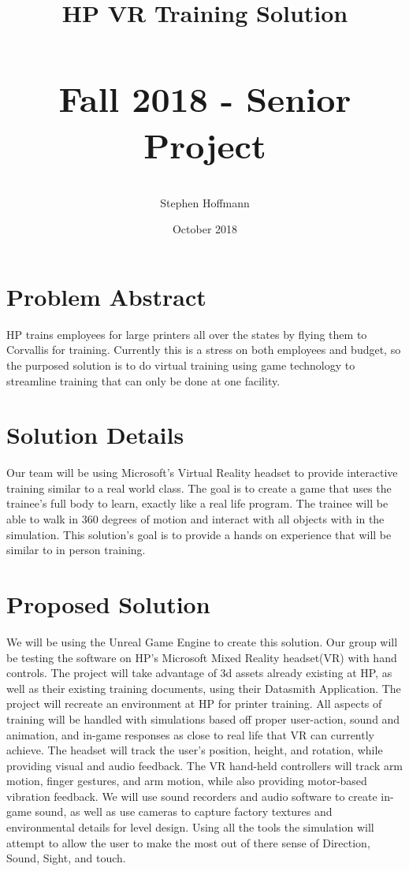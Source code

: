 \documentclass{article}
\title{
    \begin{center}
            \newline HP VR Training Solution 
            \subsection*{ Fall 2018 - Senior Project}
    \end{center}
}
\author{Stephen Hoffmann}
\date{October 2018}
\begin{document}
\maketitle 


\section*{Problem Abstract}
HP trains employees for large printers all over the states by flying them to Corvallis for training. Currently this is a stress on both employees and budget, so the purposed solution is to do virtual training using game technology to streamline training that can only be done at one facility.

\newpage


\section*{Solution Details}
Our team will be using Microsoft's Virtual Reality headset to provide interactive training similar to a real world class. The goal is to create a game that uses the trainee's full body to learn, exactly like a real life program. The trainee will be able to walk in 360 degrees of motion and interact with all objects with in the simulation. This solution's goal is to provide a hands on experience that will be similar to in person training.

\section*{Proposed Solution}
We will be using the Unreal Game Engine to create this solution. Our group will be testing the software on HP's Microsoft Mixed Reality headset(VR) with hand controls. The project will take advantage of 3d assets already existing at HP, as well as their existing training documents, using their Datasmith Application. The project will recreate an environment at HP for printer training. All aspects of training will be handled with simulations based off proper user-action, sound and animation, and in-game responses as close to real life that VR can currently achieve. The headset will track the user's position, height, and rotation, while providing visual and audio feedback. The VR hand-held controllers will track arm motion, finger gestures, and arm motion, while also providing motor-based vibration feedback. We will use sound recorders and audio software to create in-game sound, as well as use cameras to capture factory textures and environmental details for level design. Using all the tools the simulation will attempt to allow the user to make the most out of there sense of Direction, Sound, Sight, and touch. 
\end{document}
